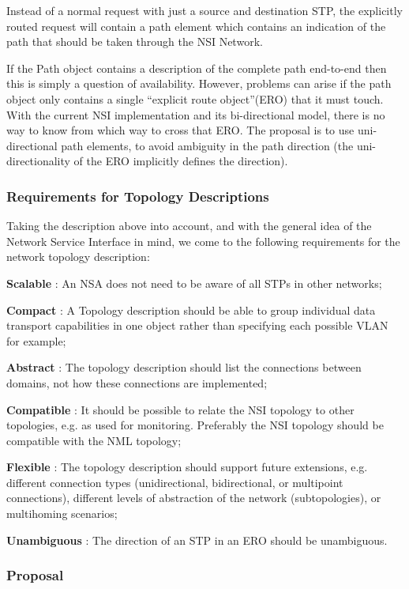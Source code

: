 \documentclass{article}
\begin{document}
 Instead of a normal request with just a source and destination 
STP, the explicitly routed request will contain a path element which contains an 
indication of the path that should be taken through the NSI Network.

 If the Path object contains a description of the complete path 
end-to-end then this is simply a question of availability. However, problems can 
arise if the path object only contains a single ``explicit route object''(ERO) 
that it must touch. With the current NSI implementation and its bi-directional 
model, there is no way to know from which way to cross that ERO. The proposal is 
to use uni-directional path elements, to avoid ambiguity in the path direction 
(the uni-directionality of the ERO implicitly defines the direction).\label{h.4s5qtlwb3csi}


\subsubsection{Requirements for Topology Descriptions}

 Taking the description above into account, and with the general 
idea of the Network Service Interface in mind, we come to the following requirements 
for the network topology description:

 \textbf{Scalable} : An NSA does not need to be 
aware of all STPs in other networks;

 \textbf{Compact} : A Topology description should 
be able to group individual data transport capabilities in one object rather than 
specifying each possible VLAN for example;

 \textbf{Abstract} : The topology description 
should list the connections between domains, not how these connections are implemented;

 \textbf{Compatible} : It should be possible to 
relate the NSI topology to other topologies, e.g. as used for monitoring. Preferably 
the NSI topology should be compatible with the NML topology;

 \textbf{Flexible} : The topology description 
should support future extensions, e.g. different connection types (unidirectional, 
bidirectional, or multipoint connections), different levels of abstraction of the 
network (subtopologies), or multihoming scenarios;

 \textbf{Unambiguous} : The direction of an STP 
in an ERO should be unambiguous.\label{h.72kynww9xxpz}


\subsubsection{Proposal}
\end{document}
